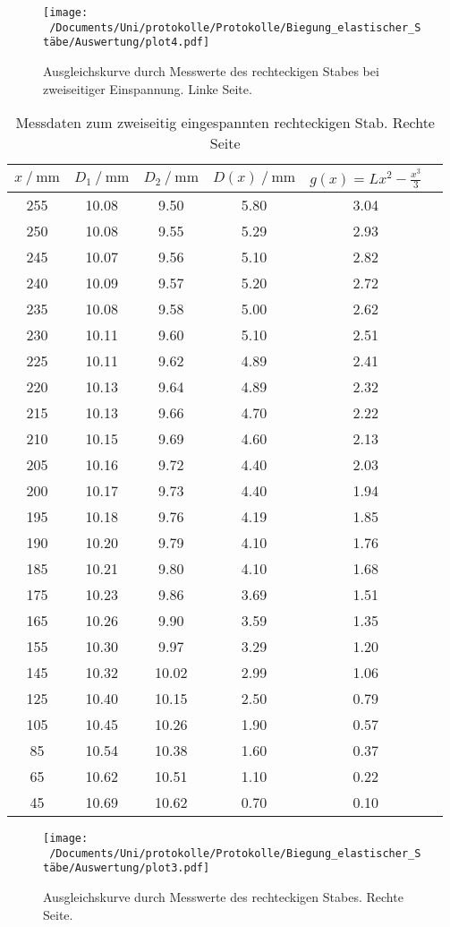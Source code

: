 \begin{figure}
  \centering
  \texttt{[image: ~/Documents/Uni/protokolle/Protokolle/Biegung\_elastischer\_Stäbe/Auswertung/plot4.pdf]}
  \caption{Ausgleichskurve durch Messwerte des rechteckigen Stabes bei zweiseitiger Einspannung. Linke Seite.}
  \label{fig:kurveRechtlinks}
\end{figure}




\begin{table}
  \centering
  \caption{Messdaten zum zweiseitig eingespannten rechteckigen Stab. Rechte Seite}
  \label{tab:zweiwerte}
  \begin{tabular}{c c c c c c}
    \toprule
      $x\:/\:\si{\milli\meter}$ & $D_1\:/\:\si{\milli\meter}$ & $D_2\:/\:\si{\milli\meter}$ & $D(x)\:/\:\si{\milli\meter}$ & $g(x)=Lx^2-\frac{x^3}{3}$ \\
    \midrule
    255 & 10.08 & 9.50 & 5.80 & 3.04 \\
    250 & 10.08 & 9.55 & 5.29 & 2.93 \\
    245 & 10.07 & 9.56 & 5.10 & 2.82 \\
    240 & 10.09 & 9.57 & 5.20 & 2.72 \\
    235 & 10.08 & 9.58 & 5.00 & 2.62 \\
    230 & 10.11 & 9.60 & 5.10 & 2.51 \\
    225 & 10.11 & 9.62 & 4.89 & 2.41 \\
    220 & 10.13 & 9.64 & 4.89 & 2.32 \\
    215 & 10.13 & 9.66 & 4.70 & 2.22 \\
    210 & 10.15 & 9.69 & 4.60 & 2.13 \\
    205 & 10.16 & 9.72 & 4.40 & 2.03 \\
    200 & 10.17 & 9.73 & 4.40 & 1.94 \\
    195 & 10.18 & 9.76 & 4.19 & 1.85 \\
    190 & 10.20 & 9.79 & 4.10 & 1.76 \\
    185 & 10.21 & 9.80 & 4.10 & 1.68 \\
    175 & 10.23 & 9.86 & 3.69 & 1.51 \\
    165 & 10.26 & 9.90 & 3.59 & 1.35 \\
    155 & 10.30 & 9.97 & 3.29 & 1.20 \\
    145 & 10.32 & 10.02 & 2.99 & 1.06 \\
    125 & 10.40 & 10.15 & 2.50 & 0.79 \\
    105 & 10.45 & 10.26 & 1.90 & 0.57 \\
    85 & 10.54 & 10.38 & 1.60 & 0.37 \\
    65 & 10.62 & 10.51 & 1.10 & 0.22 \\
    45 & 10.69 & 10.62 & 0.70 & 0.10 \\
    \bottomrule
  \end{tabular}
\end{table}

\begin{figure}
  \centering
  \texttt{[image: ~/Documents/Uni/protokolle/Protokolle/Biegung\_elastischer\_Stäbe/Auswertung/plot3.pdf]}
  \caption{Ausgleichskurve durch Messwerte des rechteckigen Stabes. Rechte Seite.}
  \label{fig:kurveRechtrechts}
\end{figure}
